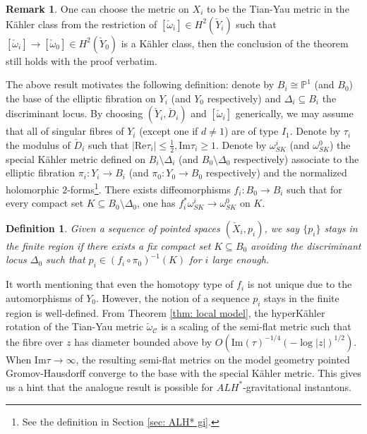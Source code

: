 \documentclass[11pt]{amsart}
\theoremstyle{plain}
\newtheorem{defn}[thm]{Definition}
\theoremstyle{definition}
\newtheorem{rk}[thm]{Remark}
\numberwithin{equation}{section}
\renewcommand{\leq}{\leqslant}
\renewcommand{\geq}{\geqslant}
\begin{document}
 \begin{rk} \label{rk LLL}
 	One can choose the metric on $X_i$ to be the Tian-Yau metric in the K\"ahler class from the restriction of $[\check{\omega}_i]\in H^2(\check{Y}_i)$ such that $[\check{\omega}_i]\rightarrow [\check{\omega}_0]\in H^2(\check{Y}_0)$ is a K\"ahler class, then the conclusion of the theorem still holds with the proof verbatim. 
 \end{rk}
  The above result motivates the following definition: denote by $B_i\cong \mathbb{P}^1$ (and $B_0$) the base of the elliptic fibration on $Y_i$ (and $Y_0$ respectively) and $\Delta_i\subseteq B_i$ the discriminant locus. By choosing $(\check{Y}_i,\check{D}_i)$ and $[\check{\omega}_i]$ generically, we may assume that all of singular fibres of $Y_i$ (except one if $d\neq 1$) are of type $I_1$. Denote by $\tau_i$ the modulus of $\check{D}_i$ such that $|\mbox{Re}\tau_i|\leq \frac{1}{2}, \mbox{Im}\tau_i\geq 1$. Denote by $\omega^i_{SK}$ (and $\omega^0_{SK}$) the special K\"ahler metric defined on $B_i\setminus \Delta_i$ (and $B_0\setminus \Delta_0$ respectively) associate to the elliptic fibration $\pi_i: Y_i\rightarrow B_i$ (and $\pi_0:Y_0\rightarrow B_0$ respectively) and the normalized holomorphic $2$-forms\footnote{See the definition in Section \ref{sec: ALH* gi}.}. There exists diffeomorphisms $f_i:B_0\rightarrow B_i$ such that for every compact set $K\subseteq B_0\setminus \Delta_0$, one has $f_i^*\omega^i_{SK}\rightarrow \omega^0_{SK}$ on $K$. 
  \begin{defn}\label{finite region}
  	 Given a sequence of pointed spaces $ (\check{X}_i, p_i)$, we say $\{p_i\}$ stays in the finite region if there exists a fix compact set $K\subseteq B_0$ avoiding the discriminant locus $\Delta_0$ such that $p_i\in  (f_i\circ \pi_0)^{-1}(K)$ for $i$ large enough. 
  \end{defn}
It worth mentioning that even the homotopy type of $f_i$ is not unique due to the automorphisms of $Y_0$. However, the notion of a sequence $p_i$ stays in the finite region is well-defined.
  From Theorem \ref{thm: local model}, the hyperK\"ahler rotation of the Tian-Yau metric $\check{\omega}_{\mathcal{C}}$ is a scaling of the semi-flat metric such that the fibre over $z$ has diameter bounded above by $O(\mbox{Im}(\tau)^{-1/4}(-\log{|z|})^{1/2})$. When $\mbox{Im}\tau\rightarrow \infty$, the resulting semi-flat metrics on the model geometry pointed Gromov-Hausdorff converge to the base with the special K\"ahler metric. This gives us a hint that the analogue result is possible for $ALH^*$-gravitational instantons. 
  
\end{document}
